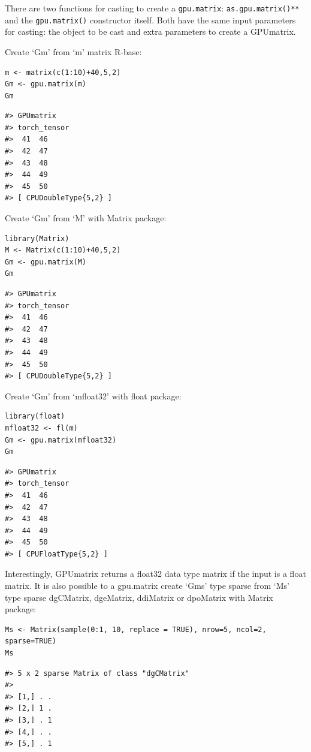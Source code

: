 There are two functions for casting to create a \texttt{gpu.matrix}: \texttt{as.gpu.matrix()**} and the \texttt{gpu.matrix()} constructor itself. Both have the same input parameters for casting: the object to be cast and extra parameters to create a GPUmatrix.

Create `Gm' from `m' matrix R-base:

\begin{verbatim}
m <- matrix(c(1:10)+40,5,2)
Gm <- gpu.matrix(m)
Gm
\end{verbatim}

\begin{verbatim}
#> GPUmatrix
#> torch_tensor
#>  41  46
#>  42  47
#>  43  48
#>  44  49
#>  45  50
#> [ CPUDoubleType{5,2} ]
\end{verbatim}

Create `Gm' from `M' with Matrix package:

\begin{verbatim}
library(Matrix)
M <- Matrix(c(1:10)+40,5,2)
Gm <- gpu.matrix(M)
Gm
\end{verbatim}

\begin{verbatim}
#> GPUmatrix
#> torch_tensor
#>  41  46
#>  42  47
#>  43  48
#>  44  49
#>  45  50
#> [ CPUDoubleType{5,2} ]
\end{verbatim}

Create `Gm' from `mfloat32' with float package:

\begin{verbatim}
library(float)
mfloat32 <- fl(m)
Gm <- gpu.matrix(mfloat32)
Gm
\end{verbatim}

\begin{verbatim}
#> GPUmatrix
#> torch_tensor
#>  41  46
#>  42  47
#>  43  48
#>  44  49
#>  45  50
#> [ CPUFloatType{5,2} ]
\end{verbatim}

Interestingly, GPUmatrix returns a float32 data type matrix if the input is a float matrix. It is also possible to a gpu.matrix create `Gms' type sparse from `Ms' type sparse dgCMatrix, dgeMatrix, ddiMatrix or dpoMatrix with Matrix package:

\begin{verbatim}
Ms <- Matrix(sample(0:1, 10, replace = TRUE), nrow=5, ncol=2, sparse=TRUE)
Ms
\end{verbatim}

\begin{verbatim}
#> 5 x 2 sparse Matrix of class "dgCMatrix"
#>         
#> [1,] . .
#> [2,] 1 .
#> [3,] . 1
#> [4,] . .
#> [5,] . 1
\end{verbatim}

